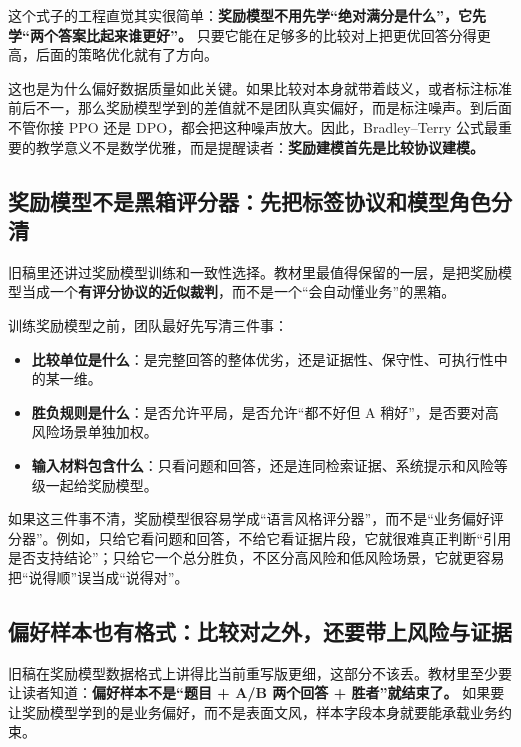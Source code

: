 这个式子的工程直觉其实很简单：\textbf{奖励模型不用先学“绝对满分是什么”，它先学“两个答案比起来谁更好”。} 只要它能在足够多的比较对上把更优回答分得更高，后面的策略优化就有了方向。

这也是为什么偏好数据质量如此关键。如果比较对本身就带着歧义，或者标注标准前后不一，那么奖励模型学到的差值就不是团队真实偏好，而是标注噪声。到后面不管你接 PPO 还是 DPO，都会把这种噪声放大。因此，Bradley--Terry 公式最重要的教学意义不是数学优雅，而是提醒读者：\textbf{奖励建模首先是比较协议建模。}

\subsection{奖励模型不是黑箱评分器：先把标签协议和模型角色分清}
旧稿里还讲过奖励模型训练和一致性选择。教材里最值得保留的一层，是把奖励模型当成一个\textbf{有评分协议的近似裁判}，而不是一个“会自动懂业务”的黑箱。

训练奖励模型之前，团队最好先写清三件事：
\begin{itemize}
  \item \textbf{比较单位是什么}：是完整回答的整体优劣，还是证据性、保守性、可执行性中的某一维。
  \item \textbf{胜负规则是什么}：是否允许平局，是否允许“都不好但 A 稍好”，是否要对高风险场景单独加权。
  \item \textbf{输入材料包含什么}：只看问题和回答，还是连同检索证据、系统提示和风险等级一起给奖励模型。
\end{itemize}

如果这三件事不清，奖励模型很容易学成“语言风格评分器”，而不是“业务偏好评分器”。例如，只给它看问题和回答，不给它看证据片段，它就很难真正判断“引用是否支持结论”；只给它一个总分胜负，不区分高风险和低风险场景，它就更容易把“说得顺”误当成“说得对”。

\subsection{偏好样本也有格式：比较对之外，还要带上风险与证据}
旧稿在奖励模型数据格式上讲得比当前重写版更细，这部分不该丢。教材里至少要让读者知道：\textbf{偏好样本不是“题目 + A/B 两个回答 + 胜者”就结束了。} 如果要让奖励模型学到的是业务偏好，而不是表面文风，样本字段本身就要能承载业务约束。

